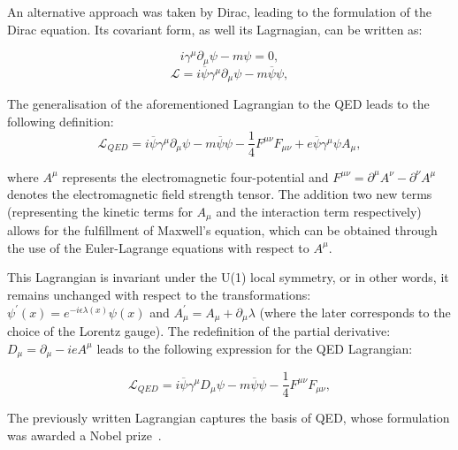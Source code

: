 \hspace{10pt} An alternative approach was taken by Dirac, leading to the formulation of the Dirac equation. Its covariant form, as well its Lagrnagian, can be written as:

\begin{equation}
    i\gamma^{\mu}\partial_{\mu}\psi-m\psi = 0,
\end{equation}
\begin{equation}
\mathcal{L} = i\overline{\psi}\gamma^{\mu}\partial_{\mu}\psi  - m\overline{\psi}\psi,
\end{equation}

The generalisation of the aforementioned Lagrangian to the QED leads to the following definition:
\begin{equation}
    \mathcal{L}_{QED} = i\overline{\psi}\gamma^{\mu}\partial_{\mu}\psi  - m\overline{\psi}\psi - \frac{1}{4} F^{\mu\nu}F_{\mu\nu} + e\overline{\psi}\gamma^{\mu}\psi A_{\mu},
\end{equation}

where $A^{\mu}$ represents the electromagnetic four-potential and $F^{\mu\nu} = \partial^{\mu}A^{\nu}-\partial^{\nu}A^{\mu}$ denotes the electromagnetic field strength tensor. The addition two new terms (representing the kinetic terms for $A_{\mu}$ and the interaction term respectively) allows for the fulfillment of Maxwell's equation, which can be obtained through the use of the Euler-Lagrange equations with respect to $A^{\mu}$.

\hspace{10pt} This Lagrangian is invariant under the U(1) local symmetry, or in other words, it remains unchanged with respect to the transformations: $\psi^{'}(x) = e^{-i\epsilon\lambda(x)}\psi(x)$ and $A^{'}_{\mu} = A_{\mu} + \partial_{\mu}\lambda$ (where the later corresponds to the choice of the Lorentz gauge). The redefinition of the partial derivative: $D_{\mu} = \partial_{\mu} - ieA^{\mu}$ leads to the following expression for the QED Lagrangian:

\begin{equation}
        \mathcal{L}_{QED} = i\overline{\psi}\gamma^{\mu}D_{\mu}\psi  - m\overline{\psi}\psi - \frac{1}{4} F^{\mu\nu}F_{\mu\nu},
\end{equation}

The previously written Lagrangian captures the basis of QED, whose formulation was awarded a Nobel prize~\cite{nobel_qed}.


